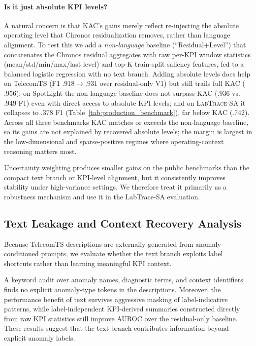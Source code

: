 \documentclass[conference]{IEEEtran}
\begin{document}
\paragraph{Is it just absolute KPI levels?} A natural concern is that KAC's gains merely reflect re-injecting the absolute operating level that Chronos residualization removes, rather than language alignment. To test this we add a \emph{non-language} baseline (``Residual+Level'') that concatenates the Chronos residual aggregates with raw per-KPI window statistics (mean/std/min/max/last level) and top-K train-split saliency features, fed to a balanced logistic regression with no text branch. Adding absolute levels does help on TelecomTS (F1 $.918\!\rightarrow\!.931$ over residual-only V1) but still trails full KAC ($.956$); on SpotLight the non-language baseline does not surpass KAC ($.936$ vs.\ $.949$ F1) even with direct access to absolute KPI levels; and on \textsc{LabTrace-SA} it collapses to $.378$ F1 (Table~\ref{tab:production_benchmark}), far below KAC ($.742$). Across all three benchmarks KAC matches or exceeds the non-language baseline, so its gains are not explained by recovered absolute levels; the margin is largest in the low-dimensional and sparse-positive regimes where operating-context reasoning matters most.

Uncertainty weighting produces smaller gains on the public benchmarks than the compact text branch or KPI-level alignment, but it consistently improves stability under high-variance settings. We therefore treat it primarily as a robustness mechanism and use it in the LabTrace-SA evaluation.
\subsection{Text Leakage and Context Recovery Analysis}
\label{sec:leakage_analysis}

Because TelecomTS descriptions are externally generated from anomaly-conditioned prompts, we evaluate whether the text branch exploits label shortcuts rather than learning meaningful KPI context.

A keyword audit over anomaly names, diagnostic terms, and context identifiers finds no explicit anomaly-type tokens in the descriptions. Moreover, the performance benefit of text survives aggressive masking of label-indicative patterns, while label-independent KPI-derived summaries constructed directly from raw KPI statistics still improve AUROC over the residual-only baseline. These results suggest that the text branch contributes information beyond explicit anomaly labels.
\end{document}
